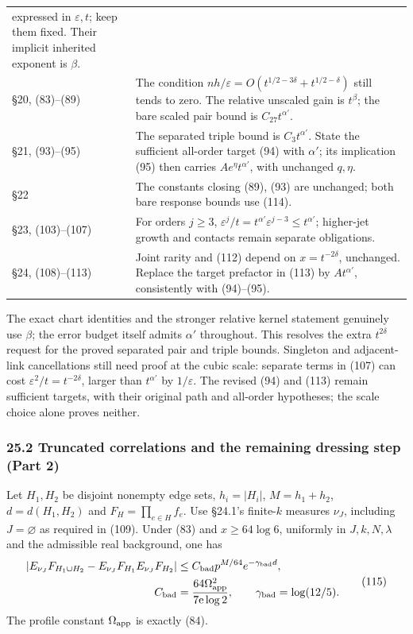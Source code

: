 \documentclass[11pt,a4paper]{article}
\begin{document}
\begin{longtable}[]{@{}
  >{\raggedright\arraybackslash}p{}
  >{\raggedright\arraybackslash}p{}@{}}
expressed in \(\varepsilon,t\); keep them fixed. Their implicit
inherited exponent is \(\beta\). \\
§20, (83)--(89) & The condition
\(nh/\varepsilon=O(t^{1/2-3\delta}+t^{1/2-\delta})\) still tends to
zero. The relative unscaled gain is \(t^\beta\); the bare scaled pair
bound is \(C_{27}t^{\alpha'}\). \\
§21, (93)--(95) & The separated triple bound is \(C_3t^{\alpha'}\).
State the sufficient all-order target (94) with \(\alpha'\); its
implication (95) then carries \(Ae^\eta t^{\alpha'}\), with unchanged
\(q,\eta\). \\
§22 & The constants closing (89), (93) are unchanged; both bare response
bounds use (114). \\
§23, (103)--(107) & For orders \(j\ge3\),
\(\varepsilon^j/t=t^{\alpha'}\varepsilon^{j-3}\le t^{\alpha'}\);
higher-jet growth and contacts remain separate obligations. \\
§24, (108)--(113) & Joint rarity and (112) depend on \(x=t^{-2\delta}\),
unchanged. Replace the target prefactor in (113) by \(At^{\alpha'}\),
consistently with (94)--(95). \\
\end{longtable}

The exact chart identities and the stronger relative kernel statement
genuinely use \(\beta\); the error budget itself admits \(\alpha'\)
throughout. This resolves the extra \(t^{2\delta}\) request for the
proved separated pair and triple bounds. Singleton and adjacent-link
cancellations still need proof at the cubic scale: separate terms in
(107) can cost \(\varepsilon^2/t=t^{-2\delta}\), larger than
\(t^{\alpha'}\) by \(1/\varepsilon\). The revised (94) and (113) remain
sufficient targets, with their original path and all-order hypotheses;
the scale choice alone proves neither.

\hypertarget{truncated-correlations-and-the-remaining-dressing-step-part-2}{%
\subsubsection{25.2 Truncated correlations and the remaining dressing
step (Part
2)}\label{truncated-correlations-and-the-remaining-dressing-step-part-2}}

Let \(H_1,H_2\) be disjoint nonempty edge sets, \(h_i=|H_i|\),
\(M=h_1+h_2\), \(d=d(H_1,H_2)\) and \(F_H=\prod_{e\in H}f_e\). Use
§24.1's finite-\(k\) measures \(\nu_J\), including \(J=\varnothing\) as
required in (109). Under (83) and \(x\ge64\log6\), uniformly in
\(J,k,N,\lambda\) and the admissible real background, one has
\[\begin{aligned}
|E_{\nu_J}F_{H_1\cup H_2}-E_{\nu_J}F_{H_1}E_{\nu_J}F_{H_2}|
&\le C_{\rm bad}p^{M/64}e^{-\gamma_{\rm bad}d},\\
C_{\rm bad}&=\frac{64\Omega_{\rm app}^2}{7\mathrm e\log2},
\qquad \gamma_{\rm bad}=\log(12/5).
\end{aligned}\tag{115}\] The profile constant \(\Omega_{\rm app}\) is
exactly (84).
\end{document}
